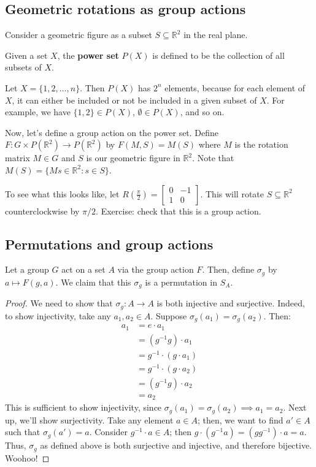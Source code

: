 \documentclass{article}
\theoremstyle{plain}
\newcommand{\R}{\mathbb{R}}
\begin{document}
\vspace{-.5cm}
\subsection{Geometric rotations as group actions}
Consider a geometric figure as a subset $S \subseteq \R^2$ in the real plane.
\begin{definition}{}{}
Given a set $X$, the \textbf{power set} $P(X)$ is defined to be the collection of all subsets of $X$. 
\end{definition}
Let $X = \{  1,2,\ldots,n \}$. Then $P(X)$ has $2^n$ elements, because for each element of $X$, it can either be included or not be included in a given subset of $X$. For example, we have $\{ 1,2 \} \in P(X)$, $\emptyset \in P(X)$, and so on.

Now, let's define a group action on the power set. Define $F : G \times P(\R^2) \to P(\R^2)$ by $F(M,S) = M(S)$ where $M$ is the rotation matrix $M \in G$ and $S$ is our geometric figure in $\R^2$. Note that $M(S) = \{ Ms \in \R^2 : s \in S \}$.

To see what this looks like, let $R(\frac{\pi}{2}) = [\begin{smallmatrix} 0 & -1 \\ 1 & 0 \end{smallmatrix}]$. This will rotate $S \subseteq \R^2$ counterclockwise by $\pi/2$. Exercise: check that this is a group action.

\subsection{Permutations and group actions}
\begin{theorem}{}{}\label{permtheorem}
Let a group $G$ act on a set $A$ via the group action $F$. Then, define $\sigma_g$ by $a \mapsto F(g,a)$. We claim that this $\sigma_g$ is a permutation in $S_A$.
\end{theorem}
\begin{proof}
We need to show that $\sigma_g : A \to A$ is both injective and surjective. Indeed, to show injectivity, take any $a_1,a_2 \in A$. Suppose $\sigma_g(a_1) = \sigma_g(a_2)$. Then:
\begin{align*}
a_1 &= e \cdot a_1 \\
&= (g^{-1}g)\cdot a_1 \\
&= g^{-1}\cdot (g \cdot a_1) \\
&= g^{-1}\cdot (g\cdot a_2) \\
&= (g^{-1}g)\cdot a_2 \\
&= a_2
\end{align*}
This is sufficient to show injectivity, since $\sigma_g(a_1) = \sigma_g(a_2) \implies a_1 = a_2$. Next up, we'll show surjectivity. Take any element $a \in A$; then, we want to find $a' \in A$ such that $\sigma_g(a') = a$. Consider $g^{-1}\cdot a \in A$; then $g \cdot (g^{-1}a) = (gg^{-1})\cdot a = a$. Thus, $\sigma_g$ as defined above is both surjective and injective, and therefore bijective. Woohoo!
\end{proof}
\end{document}
